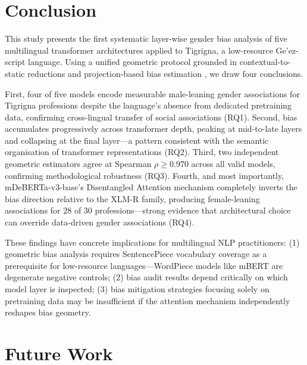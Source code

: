 \documentclass[10pt]{article}
\begin{document}
\section{Conclusion}

This study presents the first systematic layer-wise gender bias analysis
of five multilingual transformer architectures applied to Tigrigna, a
low-resource Ge'ez-script language. Using a unified geometric protocol
grounded in contextual-to-static reductions \citep{bommasani2020reductions}
and projection-based bias estimation \citep{bolukbasi2016man}, we draw four
conclusions.

First, four of five models encode measurable male-leaning gender associations
for Tigrigna professions despite the language's absence from dedicated
pretraining data, confirming cross-lingual transfer of social associations
(RQ1). Second, bias accumulates progressively across transformer depth,
peaking at mid-to-late layers and collapsing at the final layer---a pattern
consistent with the semantic organisation of transformer representations
(RQ2). Third, two independent geometric estimators agree at Spearman
$\rho \geq 0.970$ across all valid models, confirming methodological
robustness (RQ3). Fourth, and most importantly, mDeBERTa-v3-base's
Disentangled Attention mechanism completely inverts the bias direction
relative to the XLM-R family, producing female-leaning associations for
28 of 30 professions---strong evidence that architectural choice can
override data-driven gender associations (RQ4).

These findings have concrete implications for multilingual NLP practitioners:
(1) geometric bias analysis requires SentencePiece vocabulary coverage as a
prerequisite for low-resource languages---WordPiece models like mBERT are
degenerate negative controls; (2) bias audit results depend critically on
which model layer is inspected; (3) bias mitigation strategies focusing
solely on pretraining data may be insufficient if the attention mechanism
independently reshapes bias geometry.

\section{Future Work}
\end{document}
